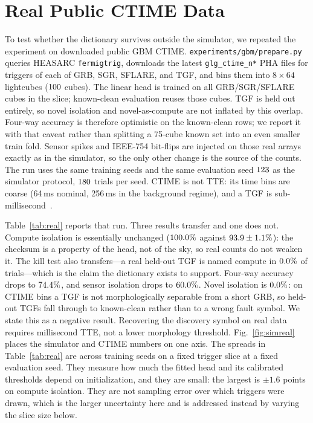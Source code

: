 \documentclass[journal]{IEEEtran}
\begin{document}
\section{Real Public CTIME Data}
\label{sec:real}

To test whether the dictionary survives outside the simulator, we repeated the experiment on downloaded public GBM CTIME. \texttt{experiments/gbm/prepare.py} queries HEASARC \texttt{fermigtrig}, downloads the latest \texttt{glg\_ctime\_n*} PHA files for \RealPerClass{} triggers of each of GRB, SGR, SFLARE, and TGF, and bins them into $8\times64$ lightcubes ($100{}$ cubes). The linear head is trained on all GRB/SGR/SFLARE cubes in the slice; known-clean evaluation reuses those cubes. TGF is held out entirely, so novel isolation and novel-as-compute are not inflated by this overlap. Four-way accuracy is therefore optimistic on the known-clean rows; we report it with that caveat rather than splitting a 75-cube known set into an even smaller train fold. Sensor spikes and IEEE-754 bit-flips are injected on those real arrays exactly as in the simulator, so the only other change is the source of the counts. The run uses the same \RealSeeds{} training seeds and the same evaluation seed $123$ as the simulator protocol, $180{}$ trials per seed. CTIME is not TTE: its time bins are coarse (64\,ms nominal, 256\,ms in the background regime), and a TGF is sub-millisecond~\cite{briggs2013}.

Table~\ref{tab:real} reports that run. Three results transfer and one does not. Compute isolation is essentially unchanged ($100.0\%$ against $93.9\pm1.1\%$): the checksum is a property of the head, not of the sky, so real counts do not weaken it. The kill test also transfers---a real held-out TGF is named compute in $0.0\%$ of trials---which is the claim the dictionary exists to support. Four-way accuracy drops to $74.4\%$, and sensor isolation drops to $60.0\%$. Novel isolation is $0.0\%$: on CTIME bins a TGF is not morphologically separable from a short GRB, so held-out TGFs fall through to known-clean rather than to a wrong fault symbol. We state this as a negative result. Recovering the discovery symbol on real data requires millisecond TTE, not a lower morphology threshold. Fig.~\ref{fig:simreal} places the simulator and CTIME numbers on one axis. The spreads in Table~\ref{tab:real} are across training seeds on a fixed trigger slice at a fixed evaluation seed. They measure how much the fitted head and its calibrated thresholds depend on initialization, and they are small: the largest is $\pm1.6$ points on compute isolation. They are not sampling error over which triggers were drawn, which is the larger uncertainty here and is addressed instead by varying the slice size below.
\end{document}
